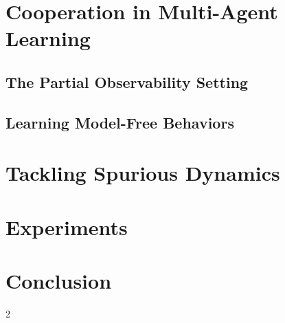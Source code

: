 \documentclass{article}
\begin{document}
\begin{multicols}{2}
\section{Cooperation in Multi-Agent Learning}

\subsection{The Partial Observability Setting}

\subsection{Learning Model-Free Behaviors}

\section{Tackling Spurious Dynamics}




\section{Experiments}

\subsection{}



\section{Conclusion}


 
\small{}
\end{multicols}{2}
\end{document}
